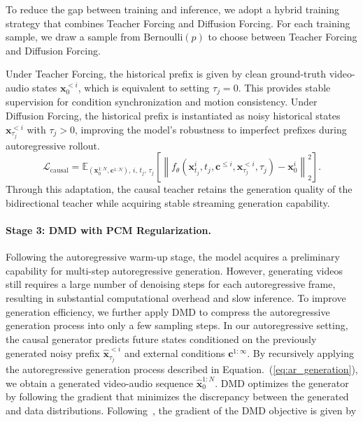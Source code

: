 To reduce the gap between training and inference, we adopt a hybrid training strategy that combines Teacher Forcing and Diffusion Forcing. 
For each training sample, we draw a sample from \(\mathrm{Bernoulli}(p)\) to choose between Teacher Forcing and Diffusion Forcing.

Under Teacher Forcing, the historical prefix is given by clean ground-truth video-audio states ${\bm{x}}_{0}^{<i}$, which is equivalent to setting $\tau_j=0$. This provides stable supervision for condition synchronization and motion consistency. Under Diffusion Forcing, the historical prefix is instantiated as noisy historical states ${\bm{x}}_{\tau_j}^{<i}$ with $\tau_j>0$, improving the model's robustness to imperfect prefixes during autoregressive rollout.
\begin{equation}
\mathcal{L}_{\mathrm{causal}}
=
\mathbb{E}_{({\bm{x}}_0^{1:N},{\bm{c}}^{1:N}),\,i,\,t_j,\,\tau_j}
\left[
\left\|
f_\theta({\bm{x}}_{t_j}^{i},t_j,{\bm{c}}^{\leq i},{\bm{x}}_{\tau_j}^{<i},\tau_j)
-
{\bm{x}}_{0}^{i}
\right\|_2^2
\right].
\label{eq:causal_loss}
\end{equation}
Through this adaptation, the causal teacher retains the generation quality of the bidirectional teacher while acquiring stable streaming generation capability.

\paragraph{Stage 3: DMD with PCM Regularization.}
Following the autoregressive warm-up stage, the model acquires a preliminary capability for multi-step autoregressive generation. 
However, generating videos still requires a large number of denoising steps for each autoregressive frame, resulting in substantial computational overhead and slow inference. 
To improve generation efficiency, we further apply DMD to compress the autoregressive generation process into only a few sampling steps. In our autoregressive setting, the causal generator predicts future states conditioned on the previously generated noisy prefix $\hat{{\bm{x}}}_{\tau_j}^{<i}$ and external conditions ${\bm{c}}^{1:\infty}$. 
By recursively applying the autoregressive generation process described in Equation.~(\ref{eq:ar_generation}), we obtain a generated video-audio sequence $\hat{\bm{x}}_0^{1:N}$. DMD optimizes the generator by following the gradient that minimizes the discrepancy between the generated and data distributions. Following~\citep{yin2024one}, the gradient of the DMD objective is given by

